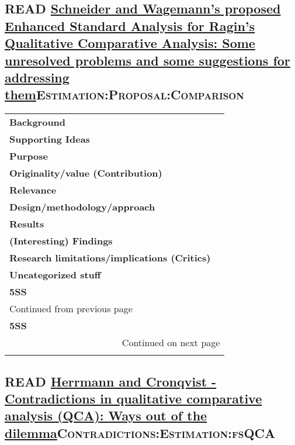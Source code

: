 \documentclass[11pt]{article}
\begin{document}
\subsection*{{\bfseries\sffamily READ} \href{http://www.compasss.org/wpseries/CooperGlaesserThomson2014.pdf}{Schneider and Wagemann's proposed Enhanced Standard Analysis for Ragin's Qualitative Comparative Analysis: Some unresolved problems and some suggestions for addressing them}\hfill{}\textsc{Estimation:Proposal:Comparison}}
\label{sec:org2de2098}
\begin{longtable}{l|p{}}
\hline
\hline
\textbf{Background} & \\
\textbf{Supporting Ideas} & \\
\textbf{Purpose} & \\
\textbf{Originality/value (Contribution)} & \\
\textbf{Relevance} & \\
\textbf{Design/methodology/approach} & \\
\textbf{Results} & \\
\textbf{(Interesting) Findings} & \\
\textbf{Research limitations/implications (Critics)} & \\
\textbf{Uncategorized stuff} & \\
\textbf{5SS} & \\
\hline
\endfirsthead
\multicolumn{2}{l}{Continued from previous page} \\

\textbf{5SS} &  \\

\hline
\endhead
\hline\multicolumn{2}{r}{Continued on next page} \\
\endfoot
\endlastfoot
\hline
\hline
\end{longtable}


\subsection*{{\bfseries\sffamily READ} \href{https://core.ac.uk/reader/45674020}{Herrmann and Cronqvist -  Contradictions in qualitative comparative analysis (QCA): Ways out of the dilemma}\hfill{}\textsc{Contradictions:Estimation:fsQCA}}
\label{sec:org6cd9874}
\end{document}

